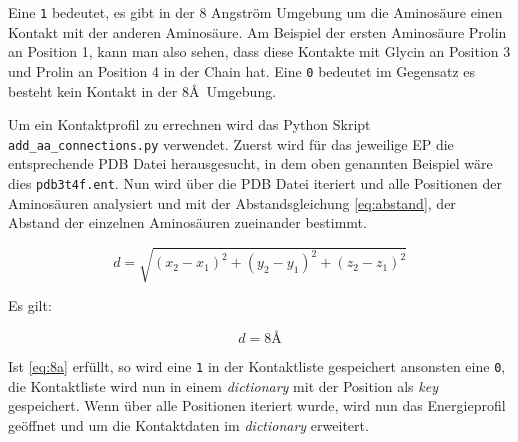 Eine \texttt{1} bedeutet, es gibt in der 8 Angström Umgebung um die Aminosäure einen Kontakt mit der anderen Aminosäure. Am Beispiel der ersten Aminosäure Prolin an Position 1, kann man also sehen, dass diese Kontakte mit Glycin an Position 3 und Prolin an Position 4 in der Chain hat. Eine \texttt{0} bedeutet im Gegensatz es besteht kein Kontakt in der 8\AA\ Umgebung.

Um ein Kontaktprofil zu errechnen wird das Python Skript \texttt{add\-\_aa\-\_connections.py} verwendet. Zuerst wird für das jeweilige \ac{EP} die entsprechende \ac{PDB} Datei herausgesucht, in dem oben genannten Beispiel wäre dies \texttt{pdb3t4f.ent}. Nun wird über die \ac{PDB} Datei iteriert und alle Positionen der Aminosäuren analysiert und mit der Abstandsgleichung \ref{eq:abstand}, der Abstand der einzelnen Aminosäuren zueinander bestimmt.

\begin{equation}
    d=\sqrt{(x_2-x_1)^2+(y_2-y_1)^2+(z_2-z_1)^2}
    \label{eq:abstand}
\end{equation}

Es gilt:

\begin{equation}
    d = 8\text{\AA}
    \label{eq:8a}
\end{equation}

Ist \ref{eq:8a} erfüllt, so wird eine \texttt{1} in der Kontaktliste gespeichert ansonsten eine \texttt{0}, die Kontaktliste wird nun in einem \emph{dictionary} mit der Position als \emph{key} gespeichert. Wenn über alle Positionen iteriert wurde, wird nun das Energieprofil geöffnet und um die Kontaktdaten im \emph{dictionary} erweitert.




